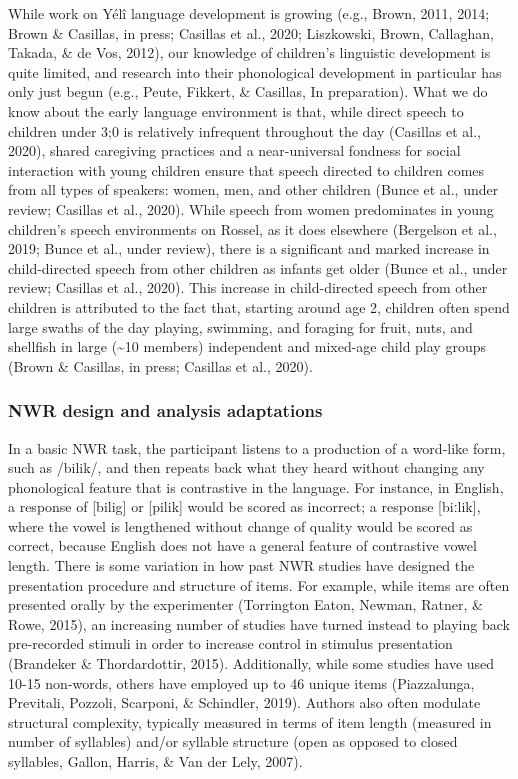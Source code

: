 \documentclass[english,,man,floatsintext]{apa6}
\begin{document}
While work on Yélî language development is growing (e.g., Brown, 2011,
2014; Brown \& Casillas, in press; Casillas et al., 2020; Liszkowski,
Brown, Callaghan, Takada, \& de Vos, 2012), our knowledge of children's
linguistic development is quite limited, and research into their
phonological development in particular has only just begun (e.g., Peute,
Fikkert, \& Casillas, In preparation). What we do know about the early
language environment is that, while direct speech to children under 3;0
is relatively infrequent throughout the day (Casillas et al., 2020),
shared caregiving practices and a near-universal fondness for social
interaction with young children ensure that speech directed to children
comes from all types of speakers: women, men, and other children (Bunce
et al., under review; Casillas et al., 2020). While speech from women
predominates in young children's speech environments on Rossel, as it
does elsewhere (Bergelson et al., 2019; Bunce et al., under review),
there is a significant and marked increase in child-directed speech from
other children as infants get older (Bunce et al., under review;
Casillas et al., 2020). This increase in child-directed speech from
other children is attributed to the fact that, starting around age 2,
children often spend large swaths of the day playing, swimming, and
foraging for fruit, nuts, and shellfish in large (\textasciitilde{}10
members) independent and mixed-age child play groups (Brown \& Casillas,
in press; Casillas et al., 2020).

\subsubsection{NWR design and analysis
adaptations}\label{nwr-design-and-analysis-adaptations}

In a basic NWR task, the participant listens to a production of a
word-like form, such as /bilik/, and then repeats back what they heard
without changing any phonological feature that is contrastive in the
language. For instance, in English, a response of {[}bilig{]} or
{[}pilik{]} would be scored as incorrect; a response {[}biːlik{]}, where
the vowel is lengthened without change of quality would be scored as
correct, because English does not have a general feature of contrastive
vowel length. There is some variation in how past NWR studies have
designed the presentation procedure and structure of items. For example,
while items are often presented orally by the experimenter (Torrington
Eaton, Newman, Ratner, \& Rowe, 2015), an increasing number of studies
have turned instead to playing back pre-recorded stimuli in order to
increase control in stimulus presentation (Brandeker \& Thordardottir,
2015). Additionally, while some studies have used 10-15 non-words,
others have employed up to 46 unique items (Piazzalunga, Previtali,
Pozzoli, Scarponi, \& Schindler, 2019). Authors also often modulate
structural complexity, typically measured in terms of item length
(measured in number of syllables) and/or syllable structure (open as
opposed to closed syllables, Gallon, Harris, \& Van der Lely, 2007).
\end{document}
